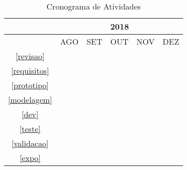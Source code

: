 \begin{table}[!ht]
\caption{Cronograma de Atividades}
\label{tab:cronograma}
\centering
    \begin{tabular}{|c|c|c|c|c|c|}
    \hline
    &\multicolumn{5}{c|}{2018}\\
    \hline
    &AGO&SET&OUT&NOV&DEZ\\
    \hline
    \ref{revisao}&\cellcolor{midgray}&&&&\\
    \hline
    \ref{requisitos}&\cellcolor{midgray}&\cellcolor{midgray}&&&\\
    \hline	
    \ref{prototipo}&&\cellcolor{midgray}&&&\\
    \hline			
    \ref{modelagem}&&\cellcolor{midgray}&\cellcolor{midgray}&&\\
    \hline	
    \ref{dev}&&\cellcolor{midgray}&\cellcolor{midgray}&\cellcolor{midgray}&\\
    \hline
    \ref{teste}&&&&\cellcolor{midgray}&\\
    \hline	
    \ref{validacao}&&&&\cellcolor{midgray}&\\
    \hline	
    \ref{expo}&&&&\cellcolor{midgray}&\cellcolor{midgray}\\
    \hline
    \end{tabular}
\end{table}
\vfill